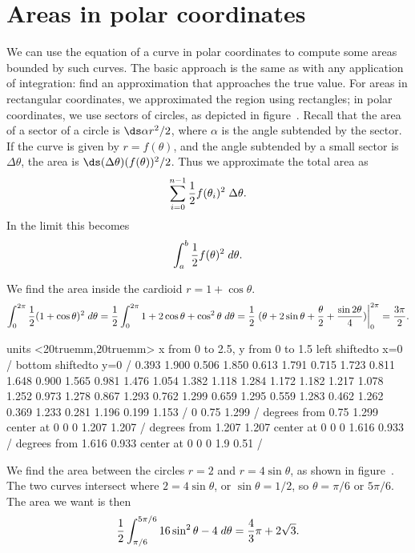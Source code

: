 \section{Areas in polar coordinates}{}{}
\nobreak
We can use the equation of a curve in polar coordinates to compute
some areas bounded by such curves.
The basic approach is the same as with any application of integration:
find an approximation that approaches the true value. For areas in
rectangular coordinates, we approximated the region using rectangles;
in polar coordinates, we use sectors of circles, as depicted in
figure~. Recall that the
area of a sector of a circle is $\ds \alpha r^2/2$, where $\alpha$ is the
angle subtended by the sector. If the curve is given by $r=f(\theta)$,
and the angle subtended by a small sector is $\Delta\theta$, 
the area is $\ds (\Delta\theta)(f(\theta))^2/2$.
Thus we approximate the total area as
$$\sum_{i=0}^{n-1} {1\over 2} f(\theta_i)^2\;\Delta\theta.$$
In the limit this becomes
$$\int_a^b {1\over 2} f(\theta)^2\;d\theta.$$

\begin{example}
We find the area inside the cardioid $r=1+\cos\theta$.
$$\int_0^{2\pi}{1\over 2} (1+\cos\theta)^2\;d\theta=
{1\over 2}\int_0^{2\pi} 1+2\cos\theta+\cos^2\theta\;d\theta=
{1\over 2}\left.(\theta +2\sin\theta+
{\theta\over2}+{\sin2\theta\over4})\right|_0^{2\pi}={3\pi\over2}.$$
\end{example}

\figure
\vbox{\beginpicture
\normalgraphs
\ninepoint
\setcoordinatesystem units <20truemm,20truemm>
\setplotarea x from 0 to 2.5, y from 0  to 1.5
\axis left shiftedto x=0 /
\axis bottom shiftedto y=0 /
\setquadratic
{} 0.393 1.900 0.506 1.850 0.613 1.791 0.715 1.723 0.811
1.648 0.900 1.565 0.981 1.476 1.054 1.382 1.118 1.284 1.172
1.182 1.217 1.078 1.252 0.973 1.278 0.867 1.293 0.762 1.299
0.659 1.295 0.559 1.283 0.462 1.262 0.369 1.233 0.281 1.196
0.199 1.153 /
\setlinear
{} 0 0.75 1.299 /
 degrees from 0.75 1.299 center at 0 0 
 0 1.207 1.207 /
 degrees from 1.207 1.207 center at 0 0
 0 1.616 0.933 / 
 degrees from 1.616 0.933 center at 0 0
 0 1.9 0.51 /
\endpicture}

\begin{example} We find the area between the circles $r=2$ and
$r=4\sin\theta$, as shown in figure~.
The two curves intersect where $2=4\sin\theta$, or $\sin\theta=1/2$,
so $\theta=\pi/6$ or $5\pi/6$. The area we want is then
$$
  {1\over2}\int_{\pi/6}^{5\pi/6}
  16\sin^2\theta-4\;d\theta={4\over3}\pi + 2\sqrt{3}.
$$
\end{example}

